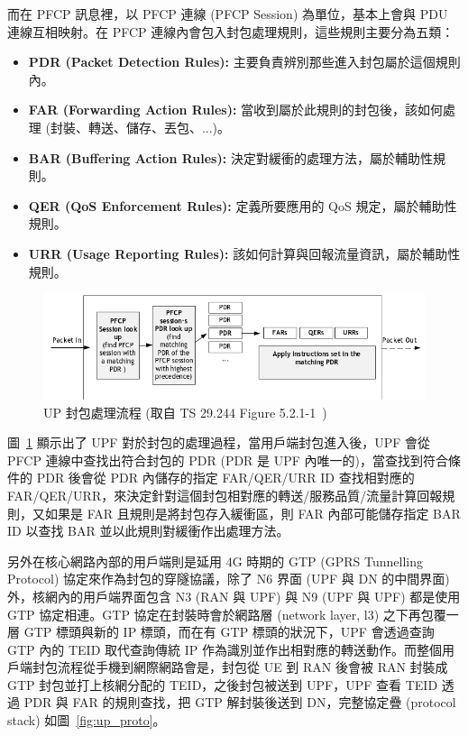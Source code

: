 而在 PFCP 訊息裡，以 PFCP 連線 (PFCP Session) 為單位，基本上會與 PDU 連線互相映射。在 PFCP 連線內會包入封包處理規則，這些規則主要分為五類：
\begin{itemize}
\item \textbf{PDR (Packet Detection Rules):} 主要負責辨別那些進入封包屬於這個規則內。
\item \textbf{FAR (Forwarding Action Rules):} 當收到屬於此規則的封包後，該如何處理 (封裝、轉送、儲存、丟包、...)。
\item \textbf{BAR (Buffering Action Rules):} 決定對緩衝的處理方法，屬於輔助性規則。
\item \textbf{QER (QoS Enforcement Rules):} 定義所要應用的 QoS 規定，屬於輔助性規則。
\item \textbf{URR (Usage Reporting Rules):} 該如何計算與回報流量資訊，屬於輔助性規則。
\end{itemize}

\begin{figure}[htbp]
    \centering
    \includegraphics[height=!,width=1\linewidth,keepaspectratio=true]
                    {figures/29_244_5-2-1-1_pack_proc_flow}
    \caption[UP 封包處理流程]{{\footnotesize UP 封包處理流程 (取自 TS 29.244 Figure 5.2.1-1~\cite{3gpp.29.244})}}
    \label{fig:up_pack_proc_flow}
\end{figure}

圖~\ref{fig:up_pack_proc_flow} 顯示出了 UPF 對於封包的處理過程，當用戶端封包進入後，UPF 會從 PFCP 連線中查找出符合封包的 PDR (PDR 是 UPF 內唯一的)，當查找到符合條件的 PDR 後會從 PDR 內儲存的指定 FAR/QER/URR ID 查找相對應的 FAR/QER/URR，來決定針對這個封包相對應的轉送/服務品質/流量計算回報規則，又如果是 FAR 且規則是將封包存入緩衝區，則 FAR 內部可能儲存指定 BAR ID 以查找 BAR 並以此規則對緩衝作出處理方法。

另外在核心網路內部的用戶端則是延用 4G 時期的 GTP (GPRS Tunnelling Protocol) 協定來作為封包的穿隧協議，除了 N6 界面 (UPF 與 DN 的中間界面) 外，核網內的用戶端界面包含 N3 (RAN 與 UPF) 與 N9 (UPF 與 UPF) 都是使用 GTP 協定相連。GTP 協定在封裝時會於網路層 (network layer, l3) 之下再包覆一層 GTP 標頭與新的 IP 標頭，而在有 GTP 標頭的狀況下，UPF 會透過查詢 GTP 內的 TEID 取代查詢傳統 IP 作為識別並作出相對應的轉送動作。而整個用戶端封包流程從手機到網際網路會是，封包從 UE 到 RAN 後會被 RAN 封裝成 GTP 封包並打上核網分配的 TEID，之後封包被送到 UPF，UPF 查看 TEID 透過 PDR 與 FAR 的規則查找，把 GTP 解封裝後送到 DN，完整協定疊 (protocol stack) 如圖~\ref{fig:up_proto}。

